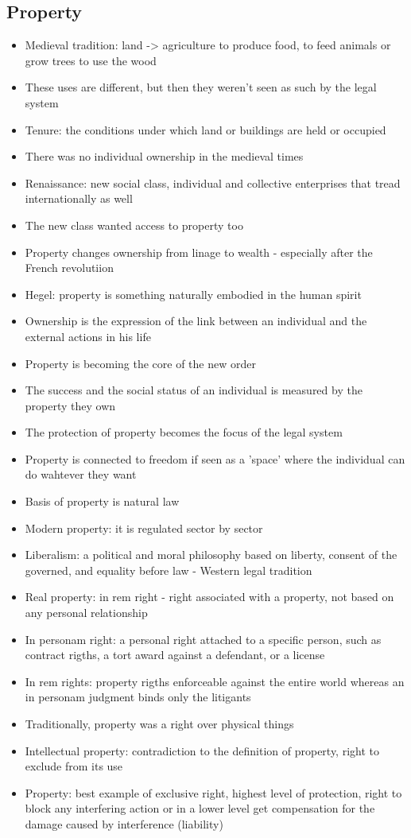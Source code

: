 \documentclass{article}
\begin{document}
\subsection{Property}
\begin{itemize}
\item Medieval tradition: land -> agriculture to produce food, to feed animals or grow trees to use the wood 
\item These uses are different, but then they weren't seen as such by the legal system
\item Tenure: the conditions under which land or buildings are held or occupied 
\item There was no individual ownership in the medieval times 
\item Renaissance: new social class, individual and collective enterprises that tread internationally as well
\item The new class wanted access to property too
\item Property changes ownership from linage to wealth - especially after the French revolutiion
\item Hegel: property is something naturally embodied in the human spirit 
\item Ownership is the expression of the link between an individual and the external actions in his life 
\item Property is becoming the core of the new order 
\item The success and the social status of an individual is measured by the property they own
\item The protection of property becomes the focus of the legal system
\item Property is connected to freedom if seen as a 'space' where the individual can do wahtever they want 
\item Basis of property is natural law 
\item Modern property: it is regulated sector by sector 
\item Liberalism: a political and moral philosophy based on liberty, consent of the governed, and equality before law - Western legal tradition
\item Real property: in rem right - right associated with a property, not based on any personal relationship 
\item In personam right: a personal right attached to a specific person, such as contract rigths, a tort award against a defendant, or a license 
\item In rem rights: property rigths enforceable against the entire world whereas an in personam judgment binds only the litigants 
\item Traditionally, property was a right over physical things 
\item Intellectual property: contradiction to the definition of property, right to exclude from its use 
\item Property: best example of exclusive right, highest level of protection, right to block any interfering action or in a lower level get compensation for the damage caused by interference (liability)
\end{itemize}
\end{document}
